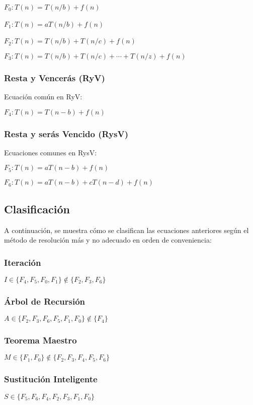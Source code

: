 \documentclass[tikz,11pt,fleqn]{book} %
\begin{document}
\( F_0 : T(n) = T(n/b) + f(n) \) \

\( F_1 : T(n) = aT(n/b) + f(n) \) \

\( F_2 : T(n) = T(n/b) + T(n/c) + f(n) \) \

\( F_3 : T(n) = T(n/b) + T(n/c) + \cdots + T(n/z) + f(n) \)

\subsubsection{Resta y Vencerás (RyV)}
Ecuación común en RyV:

\( F_4 : T(n) = T(n-b) + f(n) \)

\subsubsection{Resta y serás Vencido (RysV)}
Ecuaciones comunes en RysV:

\( F_5 : T(n) = aT(n-b) + f(n) \)

\( F_6 : T(n) = aT(n-b) + cT(n-d) + f(n) \)

\subsection{Clasificación}
A continuación, se muestra cómo se clasifican las ecuaciones anteriores según el método de resolución más y no adecuado en orden de conveniencia:

\subsubsection{Iteración}
\(  I\in\{F_4, F_5, F_0, F_1\} \not\in\{F_2, F_3, F_6\} \)

\subsubsection{Árbol de Recursión}
\(  A\in\{F_2, F_3, F_6, F_5, F_1, F_0\}\not\in\{F_4\} \)

\subsubsection{Teorema Maestro}
\(  M\in\{F_1, F_0\} \not\in\{F_2, F_3, F_4, F_5, F_6\} \)

\subsubsection{Sustitución Inteligente}
\(  S\in\{F_5, F_6, F_4, F_2, F_3, F_1, F_0\} \)
\end{document}
